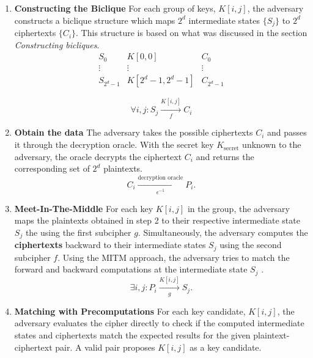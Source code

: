 \documentclass{report}
\begin{document}
 \begin{enumerate}[start = 1, label={(\bfseries Step\arabic*):}]
    \item \textbf{Constructing the Biclique} For each group of keys, \( K[i, j] \), the adversary constructs a biclique structure which maps \( 2^d \) intermediate states \( \{S_j\} \) to \( 2^d \) ciphertexts \( \{C_i\} \). This structure is based on what was discussed in the section \textit{Constructing bicliques}.
            \begin{equation}
                \begin{array}{ccc}
                    S_0 & K[0,0] & C_0 \\
                    \vdots & \vdots & \vdots \\
                    S_{2^d-1} & K[2^d-1,2^d-1] & C_{2^d-1}
                    \end{array}
            \end{equation}
                
            \begin{equation}
                \forall i, j : S_j \xrightarrow[\quad f \quad]{K[i, j]} C_i
            \end{equation}

    \item \textbf{Obtain the data} The adversary takes the possible ciphertexts $C_i$ and passes it through the decryption oracle. With the secret key $K_{\text{secret}}$ unknown to the adversary, the oracle decrypts the ciphertext $C_i$ and returns the corresponding set of $2^d$ plaintexts.
            \begin{equation}
                C_i \xrightarrow[\epsilon^{-1}]{\text{decryption oracle}} P_i.
            \end{equation}
    \item \textbf{Meet-In-The-Middle} For each key $K[i, j]$ in the group, the adversary maps the plaintexts obtained in step 2 to their respective intermediate state $S_j$ the using the first subcipher $g$. Simultaneously, the adversary computes the \textbf{ciphertexts} backward to their intermediate states $S_j$ using the second subcipher $f$. Using the MITM approach, the adversary tries to match the forward and backward computations at the intermediate state $S_j$ .
            \begin{equation}
                \exists i, j : P_i \xrightarrow[g]{K[i, j]} S_j.
            \end{equation}
    \item \textbf{Matching with Precomputations} For each key candidate, $K[i, j]$, the adversary evaluates the cipher directly to check if the computed intermediate states and ciphertexts match the expected results for the given plaintext-ciphertext pair. A valid pair proposes $K[i, j]$ as a key candidate.


 \end{enumerate}
\end{document}
